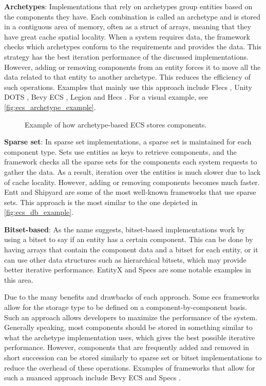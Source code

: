 \documentclass[twoside, 11pt]{article}
\begin{document}
\textbf{Archetypes}: Implementations that rely on archetypes group entities based on the components they have. Each combination is called an archetype and is stored in a contiguous area of memory, often as a struct of arrays, meaning that they have great cache spatial locality. When a system requires data, the framework checks which archetypes conform to the requirements and provides the data. This strategy has the best iteration performance of the discussed implementations. However, adding or removing components from an entity forces it to move all the data related to that entity to another archetype. This reduces the efficiency of such operations. Examples that mainly use this approach include Flecs \cite{flecs}, Unity DOTS \cite{unityDots}, Bevy ECS \cite{bevy}, Legion \cite{legion} and Hecs \cite{hecs}. For a visual example, see \autoref{fig:ecs_archetype_example}.

\begin{figure}
  \centering
  
  \caption[Example of how archetype-based ECS stores components]{Example of how archetype-based ECS stores components.}
  \label{fig:ecs_archetype_example}
\end{figure}

\textbf{Sparse set}: In sparse set implementations, a sparse set is maintained for each component type. Sets use entities as keys to retrieve components, and the framework checks all the sparse sets for the components each system requests to gather the data. As a result, iteration over the entities is much slower due to lack of cache locality. However, adding or removing components becomes much faster. Entt \cite{entt} and Shipyard \cite{shipyard} are some of the most well-known frameworks that use sparse sets. This approach is the most similar to the one depicted in \autoref{fig:ecs_db_example}.

\textbf{Bitset-based}: As the name suggests, bitset-based implementations work by using a bitset to say if an entity has a certain component. This can be done by having arrays that contain the component data and a bitset for each entity, or it can use other data structures such as hierarchical bitsets, which may provide better iterative performance. EntityX \cite{entityx} and Specs \cite{specs} are some notable examples in this area.

Due to the many benefits and drawbacks of each approach. Some \gls{ecs} frameworks allow for the storage type to be defined on a component-by-component basis. Such an approach allows developers to maximize the performance of the system. Generally speaking, most components should be stored in something similar to what the archetype implementation uses, which gives the best possible iterative performance. However, components that are frequently added and removed in short succession can be stored similarly to sparse set or bitset implementations to reduce the overhead of these operations. Examples of frameworks that allow for such a nuanced approach include Bevy ECS \cite{bevy} and Specs \cite{specs}.
\end{document}
